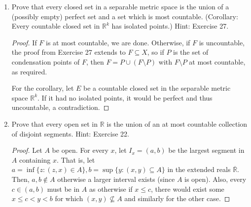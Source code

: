 \documentclass{scrbook}
\newcommand{\R}{\mathbb{R}}
\begin{document}
\begin{enumerate}
\begin{proof}
Now, let $y \in W$, so $y \in V_n$ for some $n$ such that $E \cap V_n$ is at most countable. Then, $V_n$ contains some neighbourhood of $y$ which contains at most countably many points in $E$, so $y \not\in P$. Thus $W \subseteq P^c$ and so $P \subseteq W^c$, so we conclude $P = W^c$. 

The fact that $P^c \cap E = W \cap E$ is at most countable follows by construction. Now we claim $W^c$ is perfect. The fact that $W^c$ is closed follows directly from the fact that it is the complement of a countable union of open sets. It suffices to show that each point of $W^c$ is a limit point of $W^c$. Let $x \in W^c$. If some neighbourhood of $x$ did not contain any points in $W^c$, then there must be only points in $W \cap E$. However, there are at most countably many of these points, and any neighbourhood of $x$ is uncountable. Thus the result follows.
\end{proof}

\item %
Prove that every closed set in a separable metric space is the union of a (possibly empty) perfect set and a set which is most countable. (Corollary: Every countable closed set in $\R^k$ has isolated points.) Hint: Exercise 27.

\begin{proof}
If $F$ is at most countable, we are done. Otherwise, if $F$ is uncountable, the proof from Exercise 27 extends to $F \subseteq X$, so if $P$ is the set of condensation points of $F$, then $F = P \cup (F \setminus P)$ with $F \setminus P$ at most countable, as required.

For the corollary, let $E$ be a countable closed set in the separable metric space $\R^k$. If it had no isolated points, it would be perfect and thus uncountable, a contradiction.
\end{proof}

\item %
Prove that every open set in $\R$ is the union of an at most countable collection of disjoint segments. Hint: Exercise 22.

\begin{proof}
Let $A$ be open. For every $x$, let $I_x = (a, b)$ be the largest segment in $A$ containing $x$. That is, let $a = \inf\{z: (z, x) \in A\}, b = \sup\{y: (x, y) \subseteq A\}$ in the extended reals $\overline{\R}$. Then, $a, b \not\in A$ otherwise a larger interval exists (since $A$ is open). Also, every $c \in (a, b)$ must be in $A$ as otherwise if $x \le c$, there would exist some $x \le c < y < b$ for which $(x, y) \not\subseteq A$ and similarly for the other case. 


\end{proof}
\end{enumerate}
\end{document}
